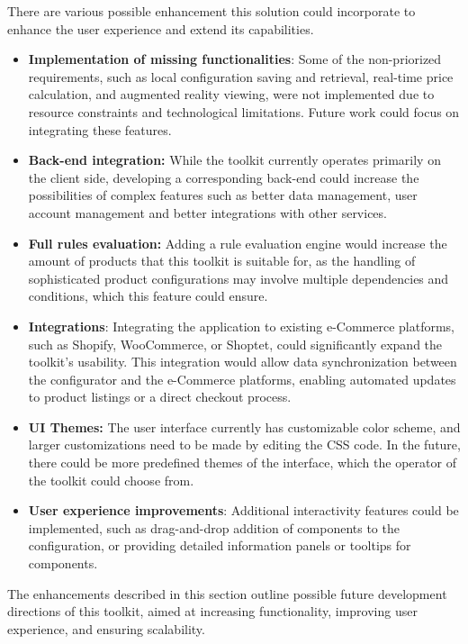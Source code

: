 There are various possible enhancement this solution could incorporate to enhance the user experience and extend its capabilities.

\begin{itemize}[label=\rectanglebullet]
    \item \textbf{Implementation of missing functionalities}: Some of the non-priorized requirements, such as local configuration saving and retrieval, real-time price calculation, and augmented reality viewing, were not implemented due to resource constraints and technological limitations. Future work could focus on integrating these features.
    \item \textbf{Back-end integration:} While the toolkit currently operates primarily on the client side, developing a corresponding back-end could increase the possibilities of complex features such as better data management, user account management and better integrations with other services.
    \item \textbf{Full rules evaluation:} Adding a rule evaluation engine would increase the amount of products that this toolkit is suitable for, as the handling of sophisticated product configurations may involve multiple dependencies and conditions, which this feature could ensure.
    \item \textbf{Integrations}: Integrating the application to existing e-Commerce platforms, such as Shopify, WooCommerce, or Shoptet, could significantly expand the toolkit's usability. This integration would allow data synchronization between the configurator and the e-Commerce platforms, enabling automated updates to product listings or a direct checkout process.
    \item \textbf{UI Themes:} The user interface currently has customizable color scheme, and larger customizations need to be made by editing the CSS code. In the future, there could be more predefined themes of the interface, which the operator of the toolkit could choose from.
    \item \textbf{User experience improvements}: Additional interactivity features could be implemented, such as drag-and-drop addition of components to the configuration, or providing detailed information panels or tooltips for components.
\end{itemize}

The enhancements described in this section outline possible future development directions of this toolkit, aimed at increasing functionality, improving user experience, and ensuring scalability.